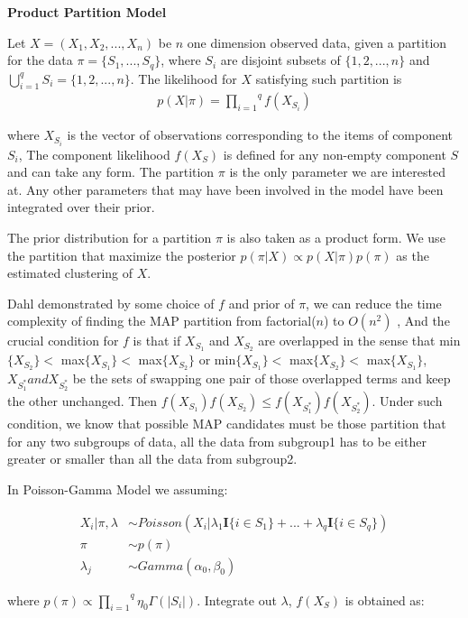 \documentclass[aoas,preprint]{imsart}
\begin{document}
\noindent
{\bf Product Partition Model}

Let $X = (X_1, X_2, ...,X_n)$ be $n$ one dimension observed data, given a partition for the data $\pi = \{S_1, ..., S_q\}$, where $S_i$ are disjoint subsets of $\{1,2,...,n\}$ and $\bigcup_{i = 1}^{q} S_i = \{1,2,...,n\}$. The likelihood for $X$ satisfying such partition is
\begin{eqnarray*}
p(X|\pi) = \overset{q}{\underset{i = 1}{\prod}}f(X_{S_i})
\end{eqnarray*}

where $X_{S_i}$ is the vector of observations corresponding to the items of component $S_i$, The component likelihood $f(X_{S})$ is defined for any non-empty component $S$ and can take any form. The partition $\pi$ is the only parameter we are interested at.
Any other parameters that may have been involved in the model have been integrated over their prior.

The prior distribution for a partition $\pi$ is also taken as a product form. We use the partition that maximize the posterior $p(\pi | X) \propto p(X|\pi) p(\pi)$ as the estimated clustering of $X$.

Dahl demonstrated by some choice of $f$ and prior of $\pi$, we can reduce the time complexity of finding the MAP partition from factorial($n$) to $O(n^2)$ \citep{ref:dahl},
And the crucial condition for $f$ is that if $X_{S_1}$ and $X_{S_2}$ are overlapped in the sense that  min$\{X_{S_2}\}  <$ max$\{X_{S_1}\}  <$ max$\{X_{S_2}\}$ or min$\{X_{S_1}\}  <$ max$\{X_{S_2}\}  <$ max$\{X_{S_1}\}$, $X_{S_1^*} and X_{S_2^*}$ be the sets of swapping one pair of those overlapped terms and keep the other unchanged. Then $f(X_{S_1}) f(X_{S_2}) \leq f(X_{S_1^*}) f(X_{S_2^*})$. Under such condition, we know that possible MAP candidates must be those partition that for any two subgroups of data, all the data from subgroup1 has to be either greater or smaller than all the data from subgroup2.


In Poisson-Gamma Model we assuming:

\begin{align*}
X_i | \pi, \lambda &\sim Poisson(X_i | \lambda_1\textbf{I}\{i\in S_1\} + ... + \lambda_q\textbf{I}\{i \in S_q\})\\
\pi &\sim p(\pi)\\
\lambda_j &\sim Gamma(\alpha_0, \beta_0)
\end{align*}

where $p(\pi)\propto \overset{q}{\underset{i = 1}{\prod}}\eta_0\Gamma(|S_i|)$. Integrate out $\lambda$, $f(X_{S})$ is obtained as:
\end{document}
